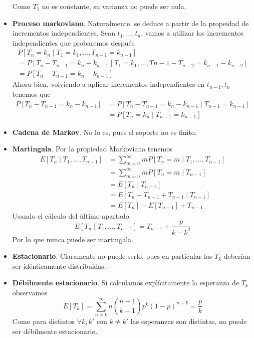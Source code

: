 \documentclass[twoside]{article}
\begin{document}
\begin{solucion}
\begin{itemize}
Como $T_1$ no es constante, su varianza no puede ser nula.
\item \textbf{Proceso markoviano}. Naturalmente, se deduce a partir de la propeidad de incrementos independientes. Sean $t_1,\dotsc,t_n$, vamos a utilizar los incrementos independientes que probaremos después
\begin{gather*}
P[T_n =  k_n \mid T_1=k_1,\dotsc,T_{n-1}=k_{n-1}] \\= P[T_n -T_{n-1} =  k_n - k_{n-1}\mid T_1=k_1,\dotsc,T{n-1}-T_{n-2}=k_{n-1}-k_{n-2}]\\
=P[T_n-T_{n-1}=k_n - k_{n-1}]
\end{gather*}
Ahora bien, volviendo a aplicar incrementos independientes en $t_{n-1},t_n$ tenemos que 
\begin{align*}
P[T_n-T_{n-1}=k_n - k_{n-1}] &= P[T_n -T_{n-1} =k_n - k_{n-1}\mid T_{n-1}  = k_{n-1}]\\
&= P[T_n =k_n \mid T_{n-1} =k_{n-1}]
\end{align*}
\item \textbf{Cadena de Markov}. No lo es, pues el soporte no es finito.
\item \textbf{Martingala}. Por la propiedad Markoviana tenemos
\begin{align*}
E[T_n \mid T_1,\dotsc,T_{n-1}] &= \sum_{m=n}^\infty m P[T_n =m \mid T_1,\dotsc,T_{n-1}]\\
&= \sum_{m=n}^\infty m P[T_n =m \mid  T_{n-1}]\\
&=E[T_n \mid T_{n-1}] \\
&= E[T_n - T_{n-1} + T_{n-1} \mid T_{n-1}] \\
&= E[T_n] - E[T_{n-1}] + T_{n-1}
\end{align*}
Usando el cálculo del último apartado
$$
E[T_n \mid T_1,\dotsc,T_{n-1}] = T_{n-1} + \frac{p}{k-k^2}
$$
Por lo que nunca puede ser martingala.
\item \textbf{Estacionario}. Claramente no puede serlo, pues en particular las $T_k$ deberían ser idénticamente distribuidas.
\item \textbf{Débilmente estacionario}. Si calculamos explícitamente la esperanza de $T_k$ observamos
$$
E[T_k] = \sum_{n=k}^\infty n \binom{n-1}{k-1}p^k(1-p)^{n-k} = \frac{p}{k}
$$
Como para distintos $\forall k,k'$ con $k\neq k'$ las esperanzas son distintas, no puede ser débilmente estacionario.
\end{itemize}
\end{solucion}

\newpage
\end{document}
